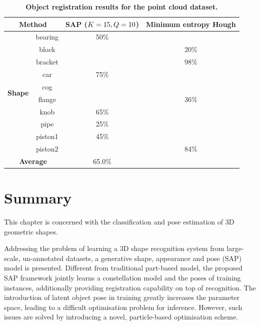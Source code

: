 \begin{table}[ht]
	\centering
	\begin{tabular}{|c|c|c|c|}
		\hline 	
		\multicolumn{2}{|c|}{\textbf{Method}} & SAP ($K = 15, Q = 10$) & Minimum entropy Hough \cite{Woodford2013} \\ \hline \hline 
		\multirow{10}{*}{\textbf{Shape}} & bearing & 50\% & \textbf{\color{blue}{83\%}} \\ \cline{2-4}  
		& block & \textbf{\color{blue}{35\%}} & 20\% \\ \cline{2-4} 
		& bracket & \textbf{\color{blue}{100\%}} & 98\% \\ \cline{2-4}
		& car & 75\% & \textbf{\color{blue}{91\%}} \\ \cline{2-4}
		& cog & \textbf{\color{blue}{100\%}} & \textbf{\color{blue}{100\%}} \\ \cline{2-4}
		& flange & \textbf{\color{blue}{60\%}} & 36\% \\ \cline{2-4}
		& knob & 65\% & \textbf{\color{blue}{91\%}} \\ \cline{2-4}
		& pipe & 25\% & \textbf{\color{blue}{89\%}} \\ \cline{2-4}
		& piston1 & 45\% & \textbf{\color{blue}{54\%}} \\ \cline{2-4}
		& piston2 & \textbf{\color{blue}{95\%}} & 84\% \\ \hline 
		\multicolumn{2}{|c|}{\textbf{Average}} & 65.0\% & \textbf{\color{blue}{74.6\%}} \\ \hline 
	\end{tabular}
	\caption{\textbf{Object registration results for the \textbf{point cloud} dataset.}}
	\label{tab/reg/regresult3d}
\end{table}

\section{Summary}
\label{sec/reg/conclusions}

This chapter is concerned with the classification and pose estimation of 3D geometric shapes. 

Addressing the problem of learning a 3D shape recognition system from large-scale, un-annotated datasets, a generative shape, appearance and pose (SAP) model is presented. Different from traditional part-based model, the proposed SAP framework jointly learns a constellation model and the poses of training instances, additionally providing registration capability on top of recognition. The introduction of latent object pose in training greatly increases the parameter space, leading to a difficult optimisation problem for inference. However, such issues are solved by introducing a novel, particle-based optimisation scheme.  

